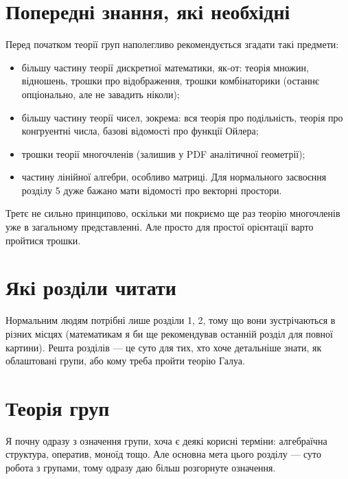\documentclass{math_library}
\begin{document}


\tableofcontents
\newpage
\section*{Попередні знання, які необхідні}
Перед початком теорії груп наполегливо рекомендується згадати такі предмети:
\begin{itemize}[nosep,wide=0pt]
\item більшу частину теорії дискретної математики, як-от: теорія множин, відношень, трошки про відображення, трошки комбінаторики (останнє опціонально, але не завадить ніколи);
\item більшу частину теорії чисел, зокрема: вся теорія про подільність, теорія про конгруентні числа, базові відомості про функції Ойлера;
\item трошки теорії многочленів (залишив у PDF аналітичної геометрії);
\item частину лінійної алгебри, особливо матриці. Для нормального засвоєння розділу 5 дуже бажано мати відомості про векторні простори.
\end{itemize}
Третє не сильно принципово, оскільки ми покриємо ще раз теорію многочленів уже в загальному представленні. Але просто для простої орієнтації варто пройтися трошки.

\section*{Які розділи читати}
Нормальним людям потрібні лише розділи 1, 2, тому що вони зустрічаються в різних місцях (математикам я би ще рекомендував останній розділ для повної картини). Решта розділів --- це суто для тих, хто хоче детальніше знати, як облаштовані групи, або кому треба пройти теорію Галуа.
\newpage


\section{Теорія груп}
Я почну одразу з означення групи, хоча є деякі корисні терміни: алгебраїчна структура, оператив, моноїд тощо. Але основна мета цього розділу --- суто робота з групами, тому одразу даю більш розгорнуте означення.
\end{document}
